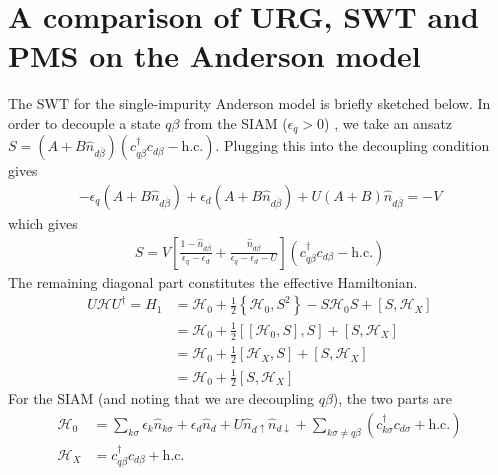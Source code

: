 \section{A comparison of URG, SWT and PMS on the Anderson model}
The SWT for the single-impurity Anderson model is briefly sketched below. In order to decouple a state \(q\beta\) from the SIAM (\(\epsilon_q > 0\)) , we take an ansatz \(S = (A + B\hat n_{d\overline\beta})(c^\dagger_{q\beta}c_{d\beta} - \text{h.c.})\). Plugging this into the decoupling condition gives
\begin{equation}\begin{aligned}
	-\epsilon_q\left(A + B\hat n_{d\overline\beta}\right) + \epsilon_d\left(A + B\hat n_{d\overline\beta}\right) + U\left(A + B\right)\hat n_{d\overline\beta} = -V
\end{aligned}\end{equation}
which gives
\begin{equation}\begin{aligned}
	S = V\left[\frac{1 - \hat n_{d\overline\beta}}{\epsilon_q - \epsilon_d} + \frac{\hat n_{d\overline\beta}}{\epsilon_q - \epsilon_d - U}\right] (c^\dagger_{q\beta}c_{d\beta} - \text{h.c.})
\end{aligned}\end{equation}
The remaining diagonal part constitutes the effective Hamiltonian.
\begin{equation}\begin{aligned}
	U\mathcal{H} U^\dagger = H_1 &= \mathcal{H}_0 + \frac{1}{2} \left\{\mathcal{H}_0, S^2\right\} - S \mathcal{H}_0 S + \left[S,\mathcal{H}_X\right]\\
				     &=\mathcal{H}_0 + \frac{1}{2} \left[\left[\mathcal{H}_0, S\right],S\right] + \left[S,\mathcal{H}_X\right]\\
				     &=\mathcal{H}_0 + \frac{1}{2} \left[\mathcal{H}_X,S\right] + \left[S,\mathcal{H}_X\right]\\
				     &=\mathcal{H}_0 + \frac{1}{2} \left[S,\mathcal{H}_X\right]
\end{aligned}\end{equation}
For the SIAM (and noting that we are decoupling \(q\beta\)), the two parts are
\begin{equation}\begin{aligned}
	\mathcal{H}_0 &= \sum_{k\sigma}\epsilon_k \hat n_{k\sigma} + \epsilon_d \hat n_d + U\hat n_{d\uparrow}\hat n_{d\downarrow} + \sum_{k\sigma \neq q\beta}\left(c^\dagger_{k\sigma}c_{d\sigma} + \text{h.c.}\right)\\
\mathcal{H}_X &= c^\dagger_{q\beta}c_{d\beta} + \text{h.c.} 
\end{aligned}\end{equation}
